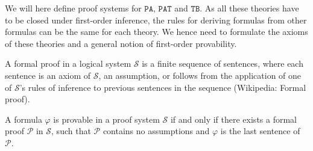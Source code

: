 We will here define proof systems for $\texttt{PA}$, $\texttt{PAT}$ and $\texttt{TB}$. As all these theories have to be closed under first-order inference, the rules for deriving formulas from other formulas can be the same for each theory. We hence need to formulate the axioms of these theories and a general notion of first-order provability. 

\begin{definition}
    A formal proof in a logical system $\mathcal{S}$ is a finite sequence of sentences, where each sentence is an axiom of $\mathcal{S}$, an assumption, or follows from the application of one of $\mathcal{S}$'s rules of inference to previous sentences in the sequence (Wikipedia: Formal proof).
\end{definition}

\begin{definition}[provability]
    A formula $\varphi$ is provable in a proof system $\mathcal{S}$ if and only if there exists a formal proof $\mathcal{P}$ in $\mathcal{S}$, such that $\mathcal{P}$ contains no assumptions and $\varphi$ is the last sentence of $\mathcal{P}$.
\end{definition}


